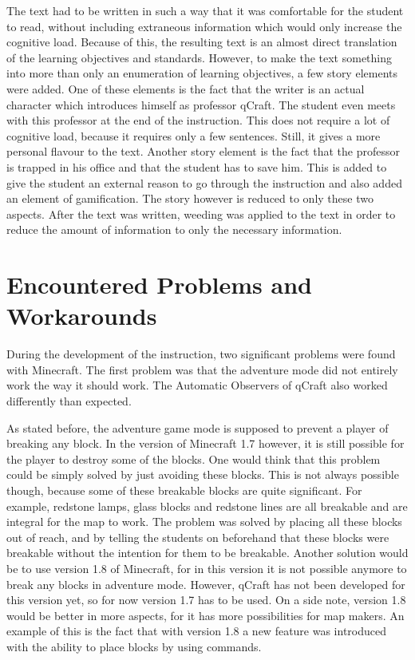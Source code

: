 \documentclass[11pt,twoside]{report} %
\begin{document}
The text had to be written in such a way that it was comfortable for the student to read, without including extraneous information which would only increase the cognitive load. Because of this, the resulting text is an almost direct translation of the learning objectives and standards. However, to make the text something into more than only an enumeration of learning objectives, a few story elements were added. One of these elements is the fact that the writer is an actual character which introduces himself as professor qCraft. The student even meets with this professor at the end of the instruction. This does not require a lot of cognitive load, because it requires only a few sentences. Still, it gives a more personal flavour to the text. Another story element is the fact that the professor is trapped in his office and that the student has to save him. This is added to give the student an external reason to go through the instruction and also added an element of gamification. The story however is reduced to only these two aspects. After the text was written, weeding was applied to the text in order to reduce the amount of information to only the necessary information.

\chapter{Encountered Problems and Workarounds}

During the development of the instruction, two significant problems were found with Minecraft. The first problem was that the adventure mode did not entirely work the way it should work. The Automatic Observers of qCraft also worked differently than expected.

As stated before, the adventure game mode is supposed to prevent a player of breaking any block. In the version of Minecraft 1.7 however, it is still possible for the player to destroy some of the blocks. One would think that this problem could be simply solved by just avoiding these blocks. This is not always possible though, because some of these breakable blocks are quite significant. For example, redstone lamps, glass blocks and redstone lines are all breakable and are integral for the map to work. The problem was solved by placing all these blocks out of reach, and by telling the students on beforehand that these blocks were breakable without the intention for them to be breakable. Another solution would be to use version 1.8 of Minecraft, for in this version it is not possible anymore to break any blocks in adventure mode. However, qCraft has not been developed for this version yet, so for now version 1.7 has to be used. On a side note, version 1.8 would be better in more aspects, for it has more possibilities for map makers. An example of this is the fact that with version 1.8 a new feature was introduced with the ability to place blocks by using commands.
\end{document}
